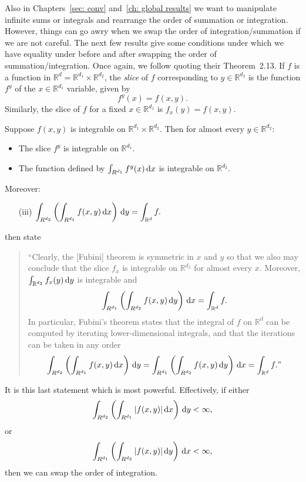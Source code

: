 Also in Chapters~\ref{sec: conv} and~\ref{ch: global results} we want to manipulate infinite sums or integrals and rearrange the order of summation or integration. However, things can go awry when we swap the order of integration/summation if we are not careful. The next few results give some conditions under which we have equality under before and after swapping the order of summation/integration. Once again, we follow \cite{steinreal} quoting their Theorem~2.13. If \(f\) is a function in \(\mathbb R^{d}=\mathbb R^{d_1}\times \mathbb R^{d_2}\), the \emph{slice} of \(f\) corresponding to \(y\in\mathbb R^{d_2}\) is the function \(f^y\) of the \(x\in\mathbb R^{d_1}\) variable, given by 
\[f^y(x)=f(x,y).\]
Similarly, the slice of \(f\) for a fixed \(x\in\mathbb R^{d_1}\) is \(f_x(y)=f(x,y)\). 
\begin{thm}\label{Fubini}
	Suppose \(f(x,y)\) is integrable on \(\mathbb R^{d_1}\times \mathbb R^{d_2}\). Then for almost every \(y\in\mathbb R^{d_2}\):
	\begin{itemize}
		\item The slice \(f^y\) is integrable on \(\mathbb R^{d_1}\).
		\item The function defined by \(\int_{R^{d_1}} f^y(x)\, \mathrm{d} x\) is integrable on \(\mathbb R^{d_2}\). 
	\end{itemize}
	Moreover:
	\begin{itemize}
		\item[(iii)] \(\displaystyle\int_{R^{d_2}}\left(\int_{R^{d_1}}f(x,y)\, \mathrm{d} x\right)\, \mathrm{d} y = \int_{\mathbb R^d}f.\)
	\end{itemize}
\end{thm}
\cite{steinreal} then state \begin{quotation}``Clearly, the [Fubini] theorem is symmetric in \(x\) and \(y\) so that we also may conclude that the slice \(f_x\) is integrable on \(\mathbb R^{d_2}\) for almost every \(x\). Moreover, \(\int_{\mathbb R^{d_2}}f_x(y)\, \mathrm{d} y\) is integrable and 
\[\displaystyle\int_{R^{d_1}}\left(\int_{R^{d_2}}f(x,y)\, \mathrm{d} y\right)\, \mathrm{d} x = \int_{\mathbb R^d}f.\]
In particular, Fubini's theorem states that the integral of \(f\) on \(\mathbb R^d\) can be computed by iterating lower-dimensional integrals, and that the iterations can be taken in any order
\[\int_{R^{d_2}}\left(\int_{R^{d_1}}f(x,y)\, \mathrm{d} x\right)\, \mathrm{d} y=\displaystyle\int_{R^{d_1}}\left(\int_{R^{d_2}}f(x,y)\, \mathrm{d} y\right)\, \mathrm{d} x = \int_{\mathbb R^d}f.\mbox{''}\]
\end{quotation}
It is this last statement which is most powerful. Effectively, if either
\[\int_{R^{d_2}}\left(\int_{R^{d_1}}|f(x,y)|\, \mathrm{d} x\right)\, \mathrm{d} y<\infty,\]
or
\[\int_{R^{d_1}}\left(\int_{R^{d_2}}|f(x,y)|\, \mathrm{d} y\right)\, \mathrm{d} x<\infty,\]
then we can swap the order of integration. 

